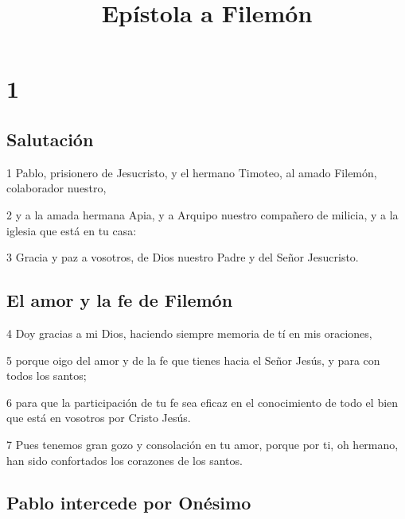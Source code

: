 
\title{Epístola a Filemón}

\chapter{1}

\section*{Salutación}

\par 1 Pablo, prisionero de Jesucristo, y el hermano Timoteo, al amado Filemón, colaborador nuestro,
\par 2 y a la amada hermana Apia, y a Arquipo nuestro compañero de milicia, y a la iglesia que está en tu casa:
\par 3 Gracia y paz a vosotros, de Dios nuestro Padre y del Señor Jesucristo.

\section*{El amor y la fe de Filemón}

\par 4 Doy gracias a mi Dios, haciendo siempre memoria de tí en mis oraciones,
\par 5 porque oigo del amor y de la fe que tienes hacia el Señor Jesús, y para con todos los santos;
\par 6 para que la participación de tu fe sea eficaz en el conocimiento de todo el bien que está en vosotros por Cristo Jesús.
\par 7 Pues tenemos gran gozo y consolación en tu amor, porque por ti, oh hermano, han sido confortados los corazones de los santos.

\section*{Pablo intercede por Onésimo}

